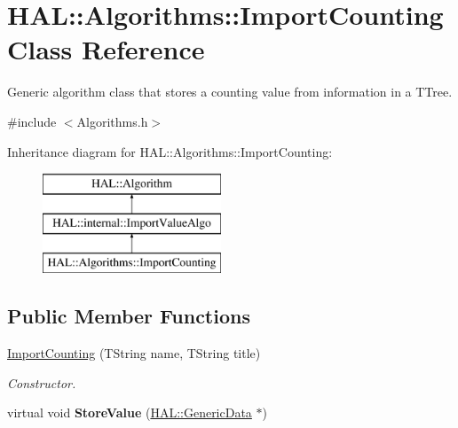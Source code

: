 \hypertarget{class_h_a_l_1_1_algorithms_1_1_import_counting}{\section{H\+A\+L\+:\+:Algorithms\+:\+:Import\+Counting Class Reference}
\label{class_h_a_l_1_1_algorithms_1_1_import_counting}
}


Generic algorithm class that stores a counting value from information in a T\+Tree.  




{\ttfamily \#include $<$Algorithms.\+h$>$}

Inheritance diagram for H\+A\+L\+:\+:Algorithms\+:\+:Import\+Counting\+:\begin{figure}[H]
\begin{center}
\leavevmode
\includegraphics[height=3.000000cm]{class_h_a_l_1_1_algorithms_1_1_import_counting}
\end{center}
\end{figure}
\subsection*{Public Member Functions}
\begin{DoxyCompactItemize}
\item 
\hyperlink{class_h_a_l_1_1_algorithms_1_1_import_counting_a533c67ebac3fbcb71c800ccb794bdf24}{Import\+Counting} (T\+String name, T\+String title)
\begin{DoxyCompactList}\small\item\em Constructor. \end{DoxyCompactList}\item 
\hypertarget{class_h_a_l_1_1_algorithms_1_1_import_counting_a5c11aa12b91c4fbe66a76d4acbfd0033}{virtual void {\bfseries Store\+Value} (\hyperlink{class_h_a_l_1_1_generic_data}{H\+A\+L\+::\+Generic\+Data} $\ast$)}\label{class_h_a_l_1_1_algorithms_1_1_import_counting_a5c11aa12b91c4fbe66a76d4acbfd0033}

\end{DoxyCompactItemize}



